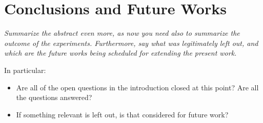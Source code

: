 \section{Conclusions and Future Works}
\textit{Summarize the abstract even more, as now you need also to summarize the outcome of the experiments. Furthermore, say what was legitimately left out, and which are the future works being scheduled for extending the present work.}

In particular:
\begin{itemize}
	\item Are all of the open questions in the introduction closed at this point? Are all the questions answered? 
	\item If something relevant is left out, is that considered for future work?
\end{itemize}